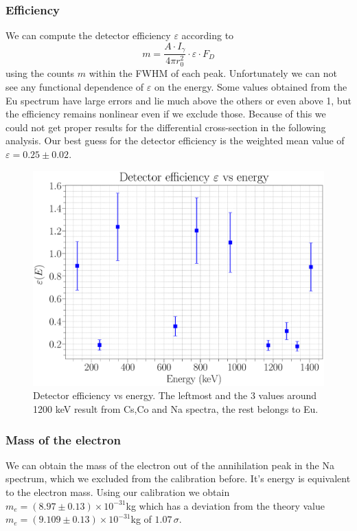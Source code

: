 \documentclass[a4paper,12pt]{article}
\begin{document}
\subsubsection{Efficiency}

We can compute the detector efficiency $\varepsilon$ according to 
\begin{equation}
	m = \frac{A \cdot I_\gamma}{4 \pi r_0^2} \cdot \varepsilon \cdot F_D
\end{equation}
using the counts $m$ within the FWHM of each peak. Unfortunately we can not see any functional dependence of $\varepsilon$ on the energy. Some values obtained from the Eu spectrum have large errors and lie much above the others or even above 1, but the efficiency remains nonlinear even if we exclude those. Because of this we could not get proper results for the differential cross-section in the following analysis. Our best guess for the detector efficiency is the weighted mean value of $\varepsilon = 0.25 \pm 0.02$.


\begin{figure}[H]
	\centering
	\includegraphics[scale=0.3]{../Figures/Efficiency.eps}
	\caption{Detector efficiency vs energy. The leftmost and the 3 values around 1200 keV result from Cs,Co and Na spectra, the rest belongs to Eu.}
	\label{efficiency}
\end{figure}

\subsubsection{Mass of the electron}
We can obtain the mass of the electron out of the annihilation peak in the Na spectrum, which we excluded from the calibration before. It's energy is equivalent to the electron mass. 
Using our calibration we obtain $m_e = (8.97 \pm 0.13) \times 10^{-31}$kg which has a deviation from the theory value $m_e = (9.109 \pm 0.13) \times 10^{-31}$kg of $1.07 \, \sigma$.
\end{document}
